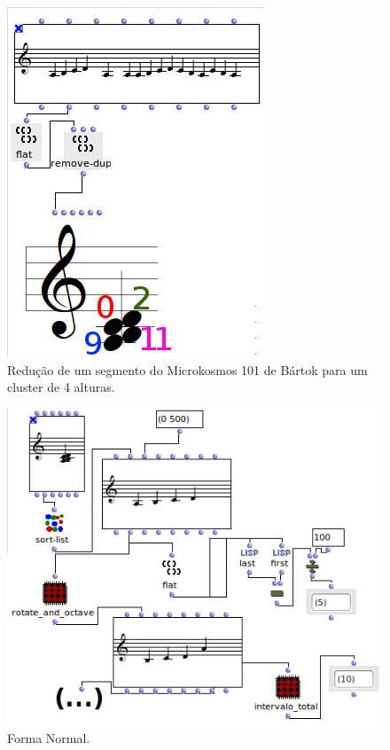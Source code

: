 \documentclass[
	12pt,				%
	openright,			%
	twoside,			%
	a4paper,			%
	english,			%
	french,				%
	spanish,			%
	brazil				%
	]{abntex2}
\begin{document}
\begin{figure}[h]
	\caption{\label{fig_grafico}Redução de um segmento do Microkosmos 101 de Bártok para um cluster de 4 alturas. }
	\begin{center}
	    \includegraphics[scale=0.7]{OM_settheory/reducao_acorde.png}
	\end{center}
\end{figure}



\begin{figure}[h]
	\caption{\label{fig_grafico}Forma Normal. }
	\begin{center}
	    \includegraphics[scale=0.7]{OM_settheory/forma_normal.png}
	\end{center}
\end{figure}
\end{document}
